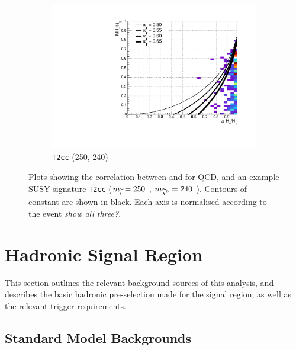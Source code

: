 \begin{figure}[h!]
\begin{subfigure}[b]{.46\textwidth}
    \caption{\zinv}
    \label{fig:alphat_corr_zinv}
  \end{subfigure}\\
  \begin{subfigure}[b]{.46\textwidth}
    \includegraphics[width=\textwidth]{Figs/alphat/alphat_correlation_T2cc_250_240.pdf}
    \caption{\texttt{T2cc} (250, 240)}
    \label{fig:alphat_corr_t2cc}
  \end{subfigure}
  \caption{Plots showing the correlation between \mht and \deltaHT for QCD,
  \zinv and an example SUSY signature \texttt{T2cc} ($m_{\widetilde{t}} = 250$ \gev,
  $m_{\widetilde{\chi}^{0}} = 240$ \gev). Contours of constant \alphat are shown in black.
  Each axis is normalised according to the event \HT \emph{show all three?}.}
  \label{fig:alphat_corr}
\end{figure}


\section{Hadronic Signal Region}
\label{sec:selection_hadronic}

This section outlines the relevant background sources of this analysis, and
describes the basic hadronic pre-selection made for the signal 
region, as well as the relevant trigger requirements.


\subsection{Standard Model Backgrounds}
